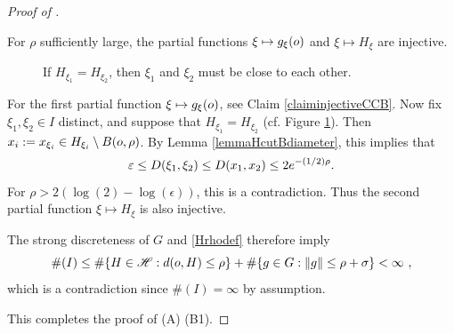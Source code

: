 \begin{proof}[Proof of ]
\begin{subproof}
\begin{claim}
\label{claiminjectiveGF}
For $\rho$ sufficiently large, the partial functions $\xi \mapsto g_\xi (o)$ and $\xi \mapsto H_\xi$ are injective.
\end{claim}
\begin{figure}
\begin{center} 
\caption[Proving that geometrically finite groups are of compact type]{If $H_{\xi_1} = H_{\xi_2}$, then $\xi_1$ and $\xi_2$ must be close to each other.}
\label{figureDSC05177B}
\end{center}
\end{figure}
\begin{subproof}
For the first partial function $\xi\mapsto g_\xi(o)$, see Claim \ref{claiminjectiveCCB}. Now fix $\xi_1,\xi_2\in I$ distinct, and suppose that $H_{\xi_1} = H_{\xi_2}$ (cf. Figure \ref{figureDSC05177B}). Then $x_i := x_{\xi_i}\in H_{\xi_i} \setminus B(o,\rho)$. By Lemma \ref{lemmaHcutBdiameter}, this implies that
\[
\varepsilon \leq D (\xi_1,\xi_2) \leq D (x_1,x_2) \leq 2 e^{-(1/2)\rho}.
\]
For $\rho > 2(\log(2) - \log(\epsilon))$, this is a contradiction. Thus the second partial function $\xi \mapsto H_\xi$ is also injective.
\end{subproof}
\noindent The strong discreteness of $G$ and \eqref{Hrhodef} therefore imply
\[
\#(I) \leq \# \{ H\in\scrH : \dist(\zero,H) \leq \rho \} + \# \{ g\in G : \dogo g \leq \rho + \sigma \} < \infty \ ,
\]
which is a contradiction since $\#(I) = \infty$ by assumption.
\end{subproof}
\noindent This completes the proof of (A) \implies (B1).
\end{proof}
